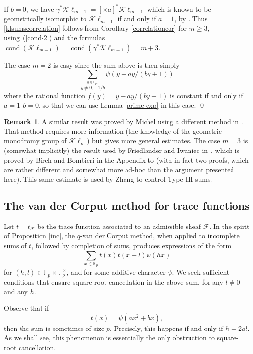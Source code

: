 \documentclass[12pt,a4paper,reqno]{amsart}
\numberwithin{equation}{section}
\DeclareMathOperator*\cond{cond}
\newcommand{\Kl}{\mathcal{K}\ell}
\theoremstyle{plain}
\theoremstyle{definition}
\newtheorem{remark}[theorem]{Remark}
\newcommand\F{\mathbb{F}}
\newcommand\ov{\overline}
\newcommand\mcF{\mathcal{F}}
\newcommand\Fp{\F_{p}}
\newcommand\Fpt{\F_{p}^{\times}}
\def\stacksum#1#2{{\stackrel{{\scriptstyle #1}}
{{\scriptstyle #2}}}}
\begin{document}
If $b=0$, we have $\gamma^*\Kl_{m-1}=[\times a]^*\Kl_{m-1}$ which is
known to be geometrically isomorphic to $\Kl_{m-1}$ if and only if
$a=1$, by \cite[Prop. 4.1.5]{GKM}. Thus \eqref{klsumscorrelation}
follows from Corollary \ref{correlationcor} for $m\geq 3$,
using~(\ref{cond-2}) and the formulas
$\cond(\Kl_{m-1})=\cond(\gamma^*\Kl_{m-1})=m+3$. 
\par
The case $m=2$ is easy since the sum above is then simply
$$
\sum_\stacksum{y\in\Fp,}{ y\neq 0,-1/b}\psi(y-ay/(by+1))
$$
where the rational function $f(y)=y-ay/(by+1)$ is constant if and only
if $a=1,b=0$, so that we can use Lemma \ref{prime-exp} in this case.
\qed

\begin{remark} 
  A similar result was proved by Michel using a different method
  in \cite[Cor.\ 2.9]{DMJPhM}. That method requires more information
  (the knowledge of the geometric monodromy group of $\Kl_m$) but
  gives more general estimates.  The case $m=3$ is (somewhat
  implicitly) the result used by Friedlander and Iwaniec
  in~\cite{fi-3}, which is proved by Birch and Bombieri in the
  Appendix to \cite{fi-3} (with in fact two proofs, which are rather
  different and somewhat more ad-hoc than the argument presented
  here). This same estimate is used by Zhang \cite{zhang} to control
  Type III sums.
\end{remark}



\subsection{The van der Corput method for trace functions}

Let $t=t_\mcF$ be the trace function associated to an admissible sheaf
$\mcF$.  In the spirit of Proposition \ref{inc}, the $q$-van der
Corput method, when applied to incomplete sums of $t$, followed by
completion of sums, produces expressions of the form
$$
\sum_{x\in\Fp}t(x)\ov{t(x+l)}\psi(hx)
$$
for $(h,l) \in\Fp\times\Fpt$, and for some additive character $\psi$. We
seek sufficient conditions that ensure square-root cancellation in the
above sum, for any $l\neq 0$ and any $h$.

Observe that if 
$$
t(x)=\psi(ax^2+bx),
$$
then the sum is sometimes of size $p$. Precisely, this happens if and
only if $h=2al$. As we shall see, this phenomenon is essentially the
only obstruction to square-root cancellation.
\end{document}

